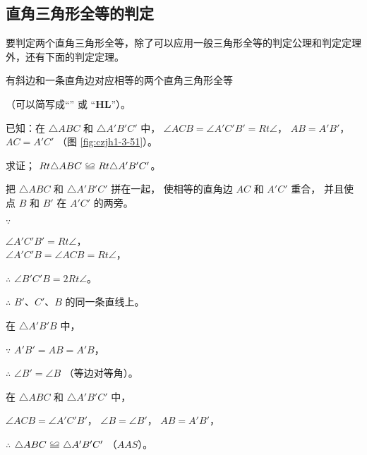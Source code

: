 \subsection{直角三角形全等的判定}\label{subsec:czjh1-3-13}

要判定两个直角三角形全等，除了可以应用一般三角形全等的判定公理和判定定理外，还有下面的判定定理。

\begin{dingli}[斜边、直角边定理]
    有斜边和一条直角边对应相等的两个直角三角形全等
\end{dingli}（可以简写成“” 或 “$\bm{HL}$”）。


已知：在 $\triangle ABC$ 和 $\triangle A'B'C'$  中，
$\angle ACB = \angle A'C'B' = Rt \angle$，
$AB = A'B'$， $AC = A'C'$ （图 \ref{fig:czjh1-3-51}）。

求证； $Rt \triangle ABC \quandeng Rt \triangle A'B'C'$。

\zhengming 把 $\triangle ABC$ 和 $\triangle A'B'C'$ 拼在一起，
使相等的直角边 $AC$ 和 $A'C'$ 重合，
并且使点 $B$ 和 $B'$  在 $A'C'$  的两旁。

$\because$ \quad \begin{zmtblr}[t]{}
    $\angle A'C'B' = Rt \angle$， \\
    $\angle A'C'B = \angle ACB = Rt \angle$，
\end{zmtblr}

$\therefore$ \quad $\angle B'C'B = 2 Rt \angle$。

$\therefore$ \quad $B'$、$C'$、$B$ 的同一条直线上。

在 $\triangle A'B'B$ 中，

$\because$ \quad $A'B' = AB = A'B$，

$\therefore$ \quad $\angle B' = \angle B$ （等边对等角）。

在 $\triangle ABC$ 和 $\triangle A'B'C'$ 中，

$\angle ACB = \angle A'C'B'$， $\angle B = \angle B'$， $AB = A'B'$，

$\therefore$ \quad $\triangle ABC \quandeng \triangle A'B'C'$ （$AAS$）。

\begin{figure}[htbp]
    \centering
    \begin{minipage}[b]{8cm}
        \centering
        
        \caption{}\label{fig:czjh1-3-51}
    \end{minipage}
    \qquad
    \begin{minipage}[b]{6cm}
        \centering
        
        \caption{}\label{fig:czjh1-3-52}
    \end{minipage}
\end{figure}


